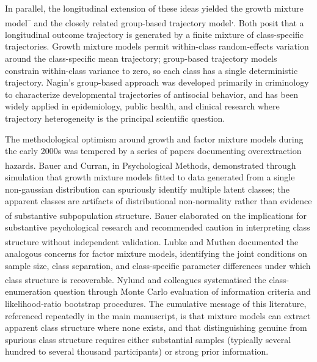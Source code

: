 \documentclass[
  11pt,
]{article}
\newcounter{none} %
\begin{document}
In parallel, the longitudinal extension of these ideas yielded the
growth mixture model\textsuperscript{--}
and the closely related group-based trajectory model\textsuperscript{,}. Both posit that a longitudinal outcome trajectory is
generated by a finite mixture of class-specific trajectories. Growth
mixture models permit within-class random-effects variation around the
class-specific mean trajectory; group-based trajectory models
constrain within-class variance to zero, so each class has a single
deterministic trajectory. Nagin's group-based approach was developed
primarily in criminology to characterize developmental trajectories of
antisocial behavior, and has been widely applied in epidemiology,
public health, and clinical research where trajectory heterogeneity is
the principal scientific question.

The methodological optimism around growth and factor mixture models
during the early 2000s was tempered by a series of papers documenting
overextraction hazards. Bauer and Curran\textsuperscript{}, in
Psychological Methods, demonstrated through simulation that growth
mixture models fitted to data generated from a single non-gaussian
distribution can spuriously identify multiple latent classes; the
apparent classes are artifacts of distributional non-normality rather
than evidence of substantive subpopulation structure. Bauer\textsuperscript{}
elaborated on the implications for substantive psychological research
and recommended caution in interpreting class structure without
independent validation. Lubke and Muthen\textsuperscript{} documented
the analogous concerns for factor mixture models, identifying the joint
conditions on sample size, class separation, and class-specific
parameter differences under which class structure is recoverable.
Nylund and colleagues\textsuperscript{} systematised the class-enumeration
question through Monte Carlo evaluation of information criteria and
likelihood-ratio bootstrap procedures. The cumulative message of this
literature, referenced repeatedly in the main manuscript, is that
mixture models can extract apparent class structure where none exists,
and that distinguishing genuine from spurious class structure requires
either substantial samples (typically several hundred to several
thousand participants) or strong prior information.
\end{document}
